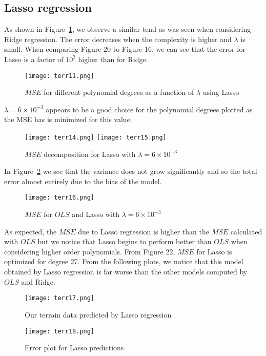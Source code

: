 \documentclass{emulateapj}
\begin{document}
\subsection{Lasso regression}
As shown in Figure~\ref{lassoterr1}, we observe a similar tend as was seen when considering Ridge regression. The error decreases when the complexity is higher and $\lambda$ is small. When comparing Figure 20 to Figure 16, we can see that the error for Lasso is a factor of $10^{2}$ higher than for Ridge.  
\begin{figure}[H]
    \centering
    \texttt{[image: terr11.png]}
    \caption{$MSE$ for different polynomial degrees as a function of $\lambda$ using Lasso}
    \label{lassoterr1}
\end{figure}
$\lambda = 6\times10^{-3}$ appears to be a good choice for the polynomial degrees plotted as the MSE has is minimized for this value.
\begin{figure}[H]
    \centering
    \texttt{[image: terr14.png]}
    \texttt{[image: terr15.png]}
    \caption{$MSE$ decomposition for Lasso with $\lambda=6\times10   ^{-3}$}
    \label{lassoterr2}
\end{figure}
In Figure~\ref{lassoterr2} we see that the variance does not grow significantly and so the total error almost entirely due to the bias of the model.
\begin{figure}[H]
    \centering
    \texttt{[image: terr16.png]}
    \caption{$MSE$ for $OLS$ and Lasso with $\lambda=6\times10   ^{-3}$}
    \label{lassoterr3}
\end{figure}
As expected, the $MSE$ due to Lasso regression is higher than the $MSE$ calculated with $OLS$ but we notice that Lasso begins to perform better than $OLS$ when considering higher order polynomials.
From Figure 22, $MSE$ for Lasso is optimized for degree 27. From the following plots, we notice that this model obtained by Lasso regression is far worse than the other models computed by $OLS$ and Ridge.
\begin{figure}[H]
    \centering
    \texttt{[image: terr17.png]}
    \caption{Our terrain data predicted by Lasso regression }
    \label{lassoterr4}
\end{figure}
\begin{figure}[H]
    \centering
    \texttt{[image: terr18.png]}
    \caption{Error plot for Lasso predictions}
    \label{lassoterrex}
\end{figure}
\end{document}

